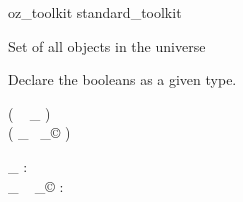 \begin{zsection}
  \SECTION oz\_toolkit \parents standard\_toolkit
\end{zsection}

Set of all objects in the universe

\begin{zed}
  [\oid]
\end{zed}

Declare the booleans as a given type.

\begin{zed}
  [\bool]
\end{zed}

\begin{zed}
  \function ( \poly ~ \_ )\\
  \function ( \_ ~_{\copyright} )\\
\end{zed}

\begin{gendef}[X]
  \poly \_ : \power \oid \fun \power \oid\\
  \_ ~ _{\copyright} : \power \oid \fun \power \oid
\end{gendef}
